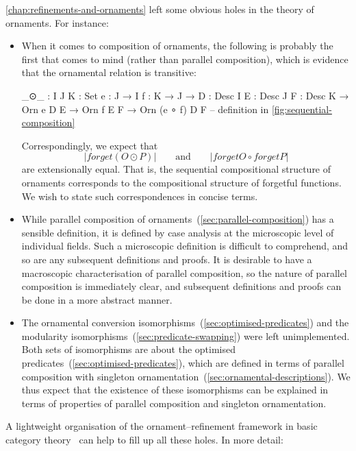 \autoref{chap:refinements-and-ornaments} left some obvious holes in the theory of ornaments.
For instance:
\begin{itemize}
\item When it comes to composition of ornaments, the following  is probably the first that comes to mind (rather than parallel composition), which is evidence that the ornamental relation is transitive:
\begin{code}
_⊙_ :  {I J K : Set} {e : J → I} {f : K → J} →
       {D : Desc I} {E : Desc J} {F : Desc K} →
       Orn e D E → Orn f E F → Orn (e ∘ f) D F
-- definition in \autoref{fig:sequential-composition}
\end{code}
Correspondingly, we expect that
\[ |forget (O ⊙ P)| \qquad\text{and}\qquad |forget O ∘ forget P| \]
are extensionally equal.
That is, the sequential compositional structure of ornaments corresponds to the compositional structure of forgetful functions.
We wish to state such correspondences in concise terms.
\item While parallel composition of ornaments~(\autoref{sec:parallel-composition}) has a sensible definition, it is defined by case analysis at the microscopic level of individual fields.
Such a microscopic definition is difficult to comprehend, and so are any subsequent definitions and proofs.
It is desirable to have a macroscopic characterisation of parallel composition, so the nature of parallel composition is immediately clear, and subsequent definitions and proofs can be done in a more abstract manner.
\item The ornamental conversion isomorphisms~(\autoref{sec:optimised-predicates}) and the modularity isomorphisms~(\autoref{sec:predicate-swapping}) were left unimplemented.
Both sets of isomorphisms are about the optimised predicates~(\autoref{sec:optimised-predicates}), which are defined in terms of parallel composition with singleton ornamentation~(\autoref{sec:ornamental-descriptions}).
We thus expect that the existence of these isomorphisms can be explained in terms of properties of parallel composition and singleton ornamentation.
\end{itemize}
A lightweight organisation of the ornament--refinement framework in basic category theory~\citep{MacLane-categories} can help to fill up all these holes.
In more detail:
